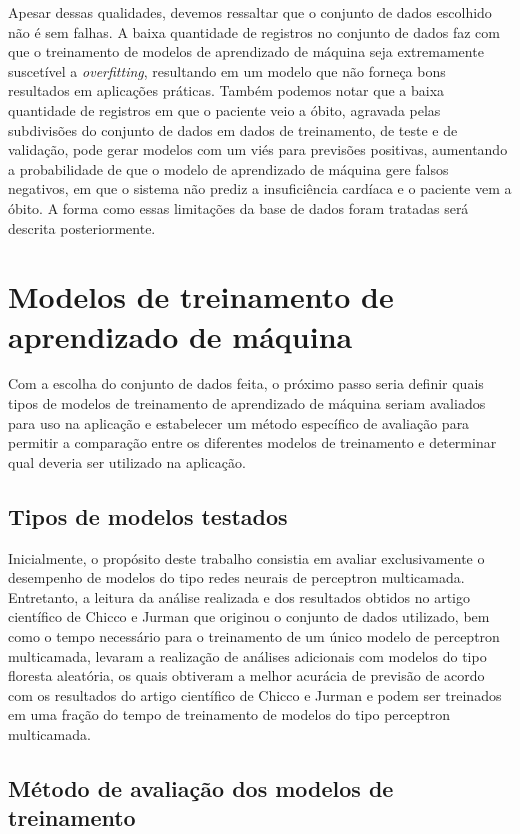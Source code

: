 Apesar dessas qualidades, devemos ressaltar que o conjunto de dados escolhido não é sem falhas. A baixa quantidade de registros no conjunto de dados faz com que o treinamento de modelos de aprendizado de máquina seja extremamente suscetível a \textit{overfitting}, resultando em um modelo que não forneça bons resultados em aplicações práticas. Também podemos notar que a baixa quantidade de registros em que o paciente veio a óbito, agravada pelas subdivisões do conjunto de dados em dados de treinamento, de teste e de validação, pode gerar modelos com um viés para previsões positivas, aumentando a probabilidade de que o modelo de aprendizado de máquina gere falsos negativos, em que o sistema não prediz a insuficiência cardíaca e o paciente vem a óbito. A forma como essas limitações da base de dados foram tratadas será descrita posteriormente.

\section{Modelos de treinamento de aprendizado de máquina}

Com a escolha do conjunto de dados feita, o próximo passo seria definir quais tipos de modelos de treinamento de aprendizado de máquina seriam avaliados para uso na aplicação e estabelecer um método específico de avaliação para permitir a comparação entre os diferentes modelos de treinamento e determinar qual deveria ser utilizado na aplicação.

\subsection{Tipos de modelos testados}

Inicialmente, o propósito deste trabalho consistia em avaliar exclusivamente o desempenho de modelos do tipo redes neurais de perceptron multicamada. Entretanto, a leitura da análise realizada e dos resultados obtidos no artigo científico de Chicco e Jurman\cite{chicco2020} que originou o conjunto de dados utilizado\cite{larxel_dataset}, bem como o tempo necessário para o treinamento de um único modelo de perceptron multicamada, levaram a realização de análises adicionais com modelos do tipo floresta aleatória, os quais obtiveram a melhor acurácia de previsão de acordo com os resultados do artigo científico de Chicco e Jurman e podem ser treinados em uma fração do tempo de treinamento de modelos do tipo perceptron multicamada.

\subsection{Método de avaliação dos modelos de treinamento}

